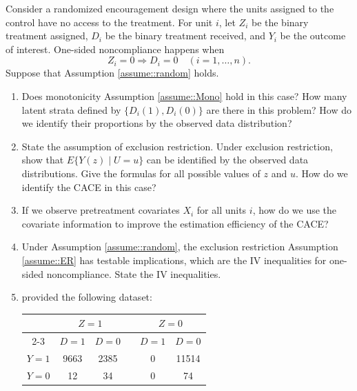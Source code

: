 \begin{HomeworkProblem}\label{exr:22-10}

Consider a randomized encouragement design where the units assigned to the control have no access to the treatment. For unit $i$, let $Z_i$ be the binary treatment assigned, $D_i$ be the binary treatment received, and $Y_i$ be the outcome of interest. One-sided noncompliance happens when
\[
Z_i=0 \Longrightarrow  D_i = 0 \quad (i=1,\ldots, n).
\]
Suppose that Assumption \ref{assume::random} holds.


\begin{enumerate}
[(1)]
\item
Does monotonicity Assumption \ref{assume::Mono} hold in this case?
How many latent strata defined by $\{ D_i(1), D_i(0)  \}$ are there in this problem? How do we identify their proportions by the observed data distribution?

\item
State the assumption of exclusion restriction. Under exclusion restriction, show that $E\{  Y(z) \mid U = u \}$ can be identified by the observed data distributions.
Give the formulas for all possible values of $z$ and $u$. How do we identify the CACE in this case?



\item
If we observe pretreatment covariates $X_i$ for all units $i$, how do we use the covariate information to improve the estimation efficiency of the CACE?


 \item
 Under Assumption \ref{assume::random}, the exclusion restriction Assumption \ref{assume::ER} has testable implications, which are the IV inequalities for one-sided noncompliance. State the IV inequalities.

\item
\citet{sommer1991estimating} provided the following dataset:

 \begin{center}
\begin{tabular}{cccccc}
\hline
      &   \multicolumn{2}{c}{$Z=1$}  &  &  \multicolumn{2}{c}{$Z=0$}  \\  \cline{2-3} \cline{5-6}
      & $D=1$  &  $D=0$           &       &  $D=1$  &  $D=0$\\
 $Y=1$ &   9663    &     2385         &      &     0       &    11514       \\
 $Y=0$ &   12   &     34            &      &     0         &    74           \\
 \hline
\end{tabular}
 \end{center}


\end{enumerate}
\end{HomeworkProblem}
